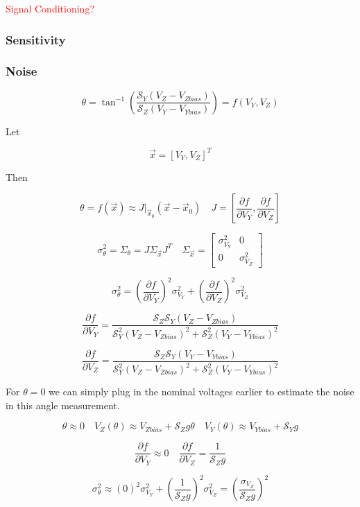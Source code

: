 \documentclass{article}
\newcommand{\xxx}[1]{\textcolor{red}{#1}}
\theoremstyle{plain}
\theoremstyle{definition}
\theoremstyle{remark}
\newcommand{\Sens}{\mathcal{S}}
\begin{document}
\xxx{Signal Conditioning?}

\subsubsection{Sensitivity}

\subsubsection{Noise}

$$ \theta = \tan^{-1} \left( \frac{\Sens_{Y} \left( V_{Z} - V_{Zbias}\right)}{\Sens_{Z} \left( V_{Y} - V_{Ybias}\right)} \right) = f(V_{Y},V_{Z})$$

Let 

$$ \vec{x} = \left[ V_Y, V_Z \right]^T $$

Then

$$ \theta = f(\vec{x}) \approx J|_{\vec{x}_0} \left( \vec{x} - \vec{x}_{0}\right) \quad J = \left[ \frac{\partial f}{\partial V_{Y}}, \frac{\partial f }{\partial V_Z} \right] $$

$$ \sigma^2_{\theta} = \Sigma_{\theta} = J \Sigma_{\vec{x}} J^T  \quad 
\Sigma_{\vec{x}} = \left[
\begin{matrix}
\sigma^2_{V_{Y}}  & 0 \\
0 & \sigma^2_{V_{Z}} 
\end{matrix} \right]$$

$$ \sigma^2_{\theta} = \left(\frac{\partial f}{\partial V_{Y}}\right)^2 \sigma^2_{V_{Y}} + \left(\frac{\partial f }{\partial V_Z} \right)^2 \sigma^2_{V_{Z}} $$

$$ \frac{\partial f}{\partial V_{Y}} = \frac{\Sens_Z \Sens_Y \left(V_{Z} - V_{Zbias} \right)}{\Sens^2_Y \left(V_Z - V_{Zbias} \right) ^2 + \Sens^2_Z \left( V_Y - V_{Ybias}\right)^2}$$

$$ \frac{\partial f }{\partial V_Z} = \frac{\Sens_Z \Sens_Y \left(V_{Y} - V_{Ybias} \right)}{\Sens^2_Y \left(V_Z - V_{Zbias} \right) ^2 + \Sens^2_Z \left( V_Y - V_{Ybias}\right)^2}$$

For $\theta = 0$ we can simply plug in the nominal voltages earlier to estimate the noise in this angle measurement.

$$ \theta \approx 0 \quad V_{Z}(\theta) \approx V_{Zbias} + \Sens_{Z} g \theta \quad V_{Y}(\theta)  \approx V_{Ybias} + \Sens_{Y} g $$

$$ \frac{\partial f}{\partial V_{Y}} \approx 0  \quad \frac{\partial f }{\partial V_Z} = \frac{1}{\Sens_{Z} g}$$

$$ \sigma^2_{\theta} \approx \left(0\right)^2 \sigma^2_{V_{Y}} + \left(\frac{1}{\Sens_{Z} g} \right)^2 \sigma^2_{V_{Z}} = \left( \frac{\sigma_{V_Z}}{\Sens_{Z} g} \right)^2$$
\end{document}
